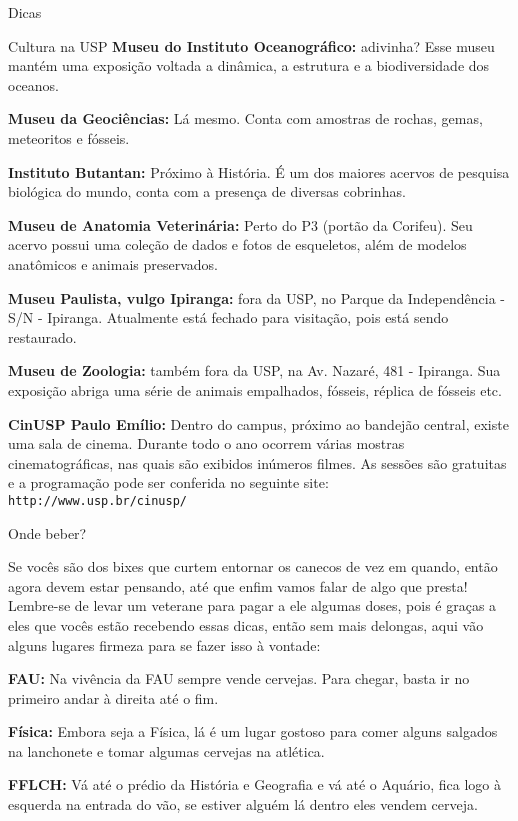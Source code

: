 \begin{secao}{Dicas}
\begin{subsecao}{Cultura na USP}
{\bf Museu do Instituto Oceanográfico:} adivinha? Esse museu mantém uma exposição voltada
a dinâmica, a estrutura e a biodiversidade dos oceanos.

{\bf Museu da Geociências:} Lá mesmo. Conta com amostras de rochas, gemas, meteoritos 
e fósseis.

{\bf Instituto Butantan:} Próximo à História. É um dos maiores acervos de pesquisa
biológica do mundo, conta com a presença de diversas cobrinhas.

{\bf Museu de Anatomia Veterinária:} Perto do P3 (portão da Corifeu). Seu acervo possui
uma coleção de dados e fotos de esqueletos, além de modelos anatômicos e animais
preservados.

{\bf Museu Paulista, vulgo Ipiranga:} fora da USP, no Parque da
Independência - S/N  - Ipiranga. Atualmente está fechado para visitação,
pois está sendo restaurado.

{\bf Museu de Zoologia:} também fora da USP, na Av. Nazaré, 481  -
Ipiranga. Sua exposição abriga uma série de animais empalhados, fósseis,
réplica de fósseis etc.

{\bf CinUSP Paulo Emílio:} Dentro do campus, próximo ao bandejão central, existe uma sala de cinema. Durante todo o ano ocorrem várias mostras cinematográficas, nas quais são exibidos inúmeros filmes. As sessões são gratuitas e a programação pode ser conferida no seguinte site: {\tt http://www.usp.br/cinusp/}


\end{subsecao}

\begin{subsecao}{Onde beber?}

Se vocês são dos bixes que curtem entornar os canecos de vez em quando, então
agora devem estar pensando, até que enfim vamos falar de algo que presta!
Lembre-se de levar um veterane para pagar a ele algumas doses, pois é graças a
eles que vocês estão recebendo essas dicas, então sem mais delongas, aqui vão
alguns lugares firmeza para se fazer isso à vontade:

{\bf FAU:} Na vivência da FAU sempre vende cervejas. Para chegar, basta ir no 
primeiro andar à direita até o fim.

{\bf Física:} Embora seja a Física, lá é um lugar gostoso para comer alguns
salgados na lanchonete e tomar algumas cervejas na atlética.

{\bf FFLCH:} Vá até o prédio da História e Geografia e vá até o Aquário, fica 
logo à esquerda na entrada do vão, se estiver alguém lá dentro eles vendem cerveja.


\end{subsecao}
\end{secao}
